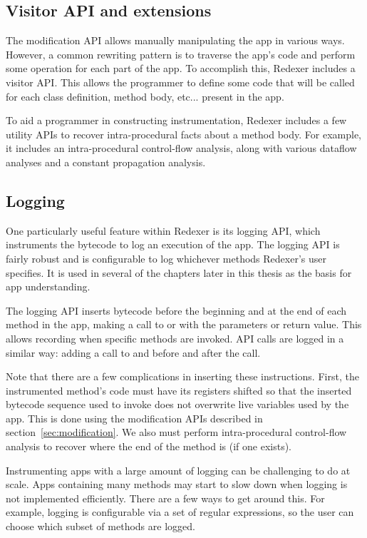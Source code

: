 \subsection{Visitor API and extensions}

The modification API allows manually manipulating the app in various
ways. However, a common rewriting pattern is to traverse the app's
code and perform some operation for each part of the app. To
accomplish this, Redexer includes a visitor API. This allows the
programmer to define some code that will be called for each class
definition, method body, etc... present in the app.

To aid a programmer in constructing instrumentation, Redexer includes
a few utility APIs to recover intra-procedural facts about a method
body. For example, it includes an intra-procedural control-flow
analysis, along with various dataflow analyses and a constant
propagation analysis.

\subsection{Logging}

One particularly useful feature within Redexer is its logging API,
which instruments the bytecode to log an execution of the app. The
logging API is fairly robust and is configurable to log whichever
methods Redexer's user specifies. It is used in several of the
chapters later in this thesis as the basis for app understanding. 

The logging API inserts bytecode before the beginning and at the end
of each method in the app, making a call to  or
 with the parameters or return value. This allows
recording when specific methods are invoked. API calls are logged in a
similar way: adding a call to  and 
before and after the call. 

Note that there are a few complications in inserting these
instructions. First, the instrumented method's code must have its
registers shifted so that the inserted bytecode sequence used to
invoke  does not overwrite live variables used by
the app. This is done using the modification APIs described in
section~\ref{sec:modification}. We also must perform intra-procedural
control-flow analysis to recover where the end of the method is (if
one exists).

Instrumenting apps with a large amount of logging can be challenging
to do at scale. Apps containing many methods may start to slow down
when logging is not implemented efficiently. There are a few ways to
get around this. For example, logging is configurable via a set of
regular expressions, so the user can choose which subset of methods
are logged. 

